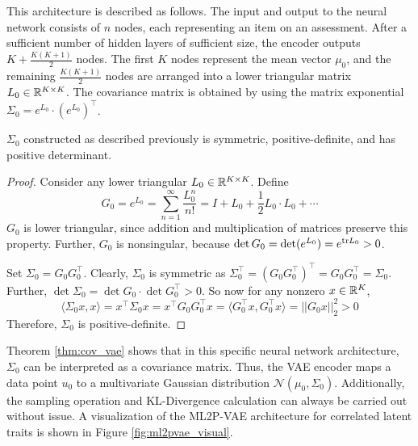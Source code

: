 This architecture is described as follows. The input and output to the neural network consists of $n$ nodes, each representing an item on an assessment. After a sufficient number of hidden layers of sufficient size, the encoder outputs $K + \frac{K(K+1)}{2}$ nodes. The first $K$ nodes represent the mean vector $\mu_0$, and the remaining $\frac{K(K+1)}{2}$ nodes are arranged into a lower triangular matrix $L_0 \in \mathbb{R}^{K\times K}$. The covariance matrix is obtained by using the matrix exponential $\Sigma_0 = e^{L_0} \cdot \left( e^{L_0} \right)^\top$.

\begin{theorem}
  $\Sigma_0$ constructed as described previously is symmetric, positive-definite, and has positive determinant.
  \label{thm:cov_vae}
\end{theorem}
\begin{proof}
  Consider any lower triangular $L_0 \in \mathbb{R}^{K\times K}$. Define 
  \[G_0 = e^{L_0} = \sum_{n=1}^\infty \frac{L_0^n}{n!} = I + L_0 + \frac{1}{2} L_0 \cdot L_0 + \cdots\]
  $G_0$ is lower triangular, since addition and multiplication of matrices preserve this property. Further, $G_0$ is nonsingular, because $\det G_0 = \det(e^{L_0}) = e^{\text{tr} L_0} > 0$.

  Set $\Sigma_0 = G_0 G_0^\top$. Clearly, $\Sigma_0$ is symmetric as $\Sigma_0^\top = (G_0 G_0^\top)^\top = G_0 G_0^\top = \Sigma_0$. Further, $\det \Sigma_0 = \det G_0 \cdot \det G_0^\top > 0$. So now for any nonzero $x \in \mathbb{R}^K$,
  \[\langle \Sigma_0 x, x \rangle = x^\top \Sigma_0 x = x^\top G_0 G_0^\top x = \langle G_0^\top x, G_0^\top x \rangle = ||G_0 x||_2^2 > 0\]
  Therefore, $\Sigma_0$ is positive-definite.
\end{proof}

Theorem \ref{thm:cov_vae} shows that in this specific neural network architecture, $\Sigma_0$ can be interpreted as a covariance matrix. Thus, the VAE encoder maps a data point $u_0$ to a multivariate Gaussian distribution $\mathcal{N}(\mu_0, \Sigma_0)$. Additionally, the sampling operation and KL-Divergence calculation can always be carried out without issue. A visualization of the ML2P-VAE architecture for correlated latent traits is shown in Figure \ref{fig:ml2pvae_visual}.


